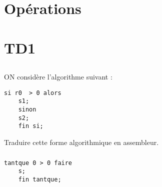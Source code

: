 \documentclass[12pt,a4paper,openany]{book}
\begin{document}
	\setcounter{tocdepth}{2}
	\setcounter{secnumdepth}{3}
	\maketitle
	\tableofcontents
	\chapter{Opérations}
	
	

	

	
	
	
	\chapter{TD1}
	\section{}
	\subsection{}
	ON considère l'algorithme suivant : 
	\begin{lstlisting}[language=Algo]
	si r0  > 0 alors
	s1;
	sinon
	s2;
	fin si;
	\end{lstlisting}
	Traduire cette forme algorithmique en assembleur.
	
	\subsection{}
	\begin{lstlisting}[language=Algo]
	tantque 0 > 0 faire
	s;
	fin tantque;
	\end{lstlisting}
	

	\section{}
	\subsection{}
	
	
\end{document}
